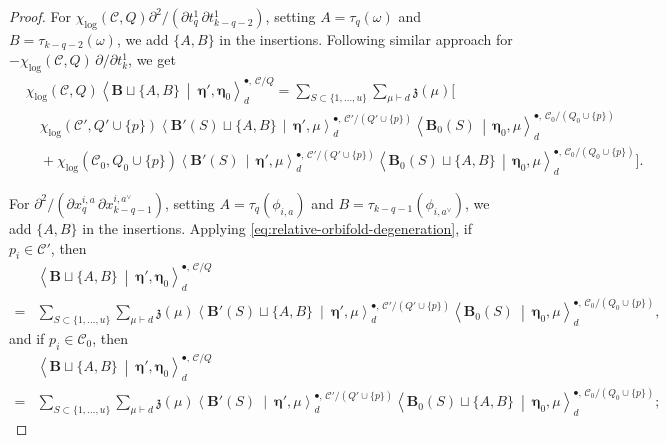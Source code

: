 \documentclass[letterpaper,12pt]{amsart}
\theoremstyle{definition}
\newcommand{\cC}{\mathcal C}
\numberwithin{equation}{section}
\begin{document}
\begin{proof}
For
\(\chi_{\log}(\cC,Q)\partial^2/(\partial t^1_q\,\partial t^1_{k-q-2})\),
setting \(A=\tau_q(\omega)\) and \(B=\tau_{k-q-2}(\omega)\), we add \(\{A,B\}\) in the insertions.
Following similar approach for \(-\chi_{\log}(\cC,Q)\,\partial/\partial t^1_k\), we get
\[
\begin{aligned}
&\chi_{\log}(\cC,Q)
 \left\langle\mathbf B\sqcup\{A,B\}
 \ \middle|\ \boldsymbol\eta',\boldsymbol\eta_0\right\rangle_d^{\bullet,\,\cC/Q}
={}\sum_{S\subset\{1,\ldots,u\}}\sum_{\mu\vdash d}\mathfrak z(\mu)\Bigg[
\\[-2mm]
&\quad\chi_{\log}(\cC',Q'\cup\{p\})
 \left\langle\mathbf B'(S)\sqcup\{A,B\}
 \,\middle|\,\boldsymbol\eta',\mu\right\rangle_d^{\bullet,\,\cC'/(Q'\cup\{p\})}
 \left\langle\mathbf B_0(S)\,\middle|\,\boldsymbol\eta_0,\mu\right\rangle_d^{\bullet,\,\cC_0/(Q_0\cup\{p\})}
\\[-1mm]
&\quad+\chi_{\log}(\cC_0,Q_0\cup\{p\})
 \left\langle\mathbf B'(S)\,\middle|\,\boldsymbol\eta',\mu\right\rangle_d^{\bullet,\,\cC'/(Q'\cup\{p\})}
 \left\langle\mathbf B_0(S)\sqcup\{A,B\}
 \,\middle|\,\boldsymbol\eta_0,\mu\right\rangle_d^{\bullet,\,\cC_0/(Q_0\cup\{p\})}\Bigg].
\end{aligned}
\]


For
\(\partial^2/(\partial x^{i,a}_q\,\partial x^{i,a^\vee}_{k-q-1})\), setting
\(A=\tau_q(\phi_{i,a})\) and
\(B=\tau_{k-q-1}(\phi_{i,a^\vee})\),  we add \(\{A,B\}\) in the insertions. Applying \eqref{eq:relative-orbifold-degeneration}, if \(p_i\in\cC'\), then
\[
\begin{aligned}
&\left\langle\mathbf B\sqcup\{A,B\}
 \ \middle|\ \boldsymbol\eta',\boldsymbol\eta_0\right\rangle_d^{\bullet,\,\cC/Q}
\\
={}&\sum_{S\subset\{1,\ldots,u\}}\sum_{\mu\vdash d}\mathfrak z(\mu)
 \left\langle\mathbf B'(S)\sqcup\{A,B\}
 \ \middle|\ \boldsymbol\eta',\mu\right\rangle_d^{\bullet,\,\cC'/(Q'\cup\{p\})}
 \left\langle\mathbf B_0(S)\ \middle|\ \boldsymbol\eta_0,\mu\right\rangle_d^{\bullet,\,\cC_0/(Q_0\cup\{p\})},
\end{aligned}
\]
and if \(p_i\in\cC_0\), then
\[
\begin{aligned}
&\left\langle\mathbf B\sqcup\{A,B\}
 \ \middle|\ \boldsymbol\eta',\boldsymbol\eta_0\right\rangle_d^{\bullet,\,\cC/Q}
\\
={}&\sum_{S\subset\{1,\ldots,u\}}\sum_{\mu\vdash d}\mathfrak z(\mu)
 \left\langle\mathbf B'(S)
 \ \middle|\ \boldsymbol\eta',\mu\right\rangle_d^{\bullet,\,\cC'/(Q'\cup\{p\})}
 \left\langle\mathbf B_0(S)\sqcup\{A,B\}\ \middle|\ \boldsymbol\eta_0,\mu\right\rangle_d^{\bullet,\,\cC_0/(Q_0\cup\{p\})};
\end{aligned}
\]


\end{proof}
\end{document}
